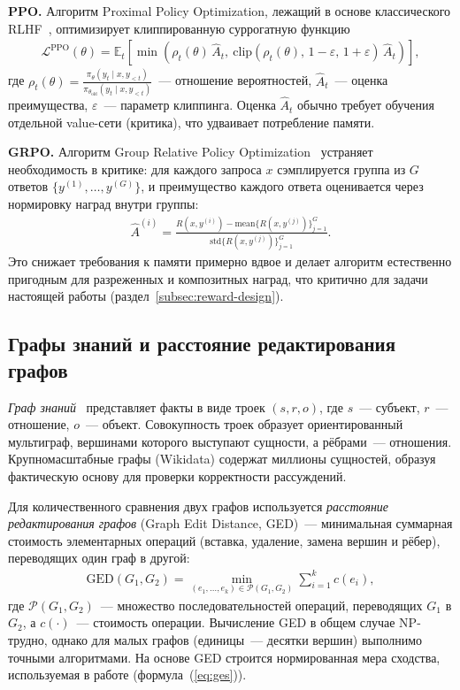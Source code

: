 \textbf{PPO.} Алгоритм Proximal Policy Optimization, лежащий в основе классического RLHF~\cite{ouyang2022training}, оптимизирует клиппированную суррогатную функцию
\begin{align}
    \mathcal{L}^{\mathrm{PPO}}(\theta) = \mathbb{E}_t\!\left[\min\!\left(\rho_t(\theta)\, \hat{A}_t,\ \mathrm{clip}(\rho_t(\theta),\, 1-\varepsilon,\, 1+\varepsilon)\, \hat{A}_t\right)\right],
    \label{eq:ppo}
\end{align}
где $\rho_t(\theta) = \frac{\pi_\theta(y_t \mid x, y_{<t})}{\pi_{\theta_{\mathrm{old}}}(y_t \mid x, y_{<t})}$~--- отношение вероятностей, $\hat{A}_t$~--- оценка преимущества, $\varepsilon$~--- параметр клиппинга. Оценка $\hat{A}_t$ обычно требует обучения отдельной value-сети (критика), что удваивает потребление памяти.

\textbf{GRPO.} Алгоритм Group Relative Policy Optimization~\cite{shao2024deepseekmath} устраняет необходимость в критике: для каждого запроса $x$ сэмплируется группа из $G$ ответов $\{y^{(1)}, \ldots, y^{(G)}\}$, и преимущество каждого ответа оценивается через нормировку наград внутри группы:
\begin{align}
    \hat{A}^{(i)} = \frac{R(x, y^{(i)}) - \mathrm{mean}\{R(x, y^{(j)})\}_{j=1}^{G}}{\mathrm{std}\{R(x, y^{(j)})\}_{j=1}^{G}}.
    \label{eq:grpo-advantage}
\end{align}
Это снижает требования к памяти примерно вдвое и делает алгоритм естественно пригодным для разреженных и композитных наград, что критично для задачи настоящей работы (раздел~\ref{subsec:reward-design}).

\subsection{Графы знаний и расстояние редактирования графов}
\label{subsec:theory-kg}

\textit{Граф знаний}~\cite{vrandecic2014wikidata} представляет факты в виде троек $(s, r, o)$, где $s$~--- субъект, $r$~--- отношение, $o$~--- объект. Совокупность троек образует ориентированный мультиграф, вершинами которого выступают сущности, а рёбрами~--- отношения. Крупномасштабные графы (Wikidata) содержат миллионы сущностей, образуя фактическую основу для проверки корректности рассуждений.

Для количественного сравнения двух графов используется \textit{расстояние редактирования графов} (Graph Edit Distance, GED)~--- минимальная суммарная стоимость элементарных операций (вставка, удаление, замена вершин и рёбер), переводящих один граф в другой:
\begin{align}
    \mathrm{GED}(G_1, G_2) = \min_{(e_1, \ldots, e_k) \in \mathcal{P}(G_1, G_2)} \sum_{i=1}^{k} c(e_i),
    \label{eq:ged}
\end{align}
где $\mathcal{P}(G_1, G_2)$~--- множество последовательностей операций, переводящих $G_1$ в $G_2$, а $c(\cdot)$~--- стоимость операции. Вычисление GED в общем случае NP-трудно, однако для малых графов (единицы~--- десятки вершин) выполнимо точными алгоритмами. На основе GED строится нормированная мера сходства, используемая в работе (формула~(\ref{eq:ges})).


